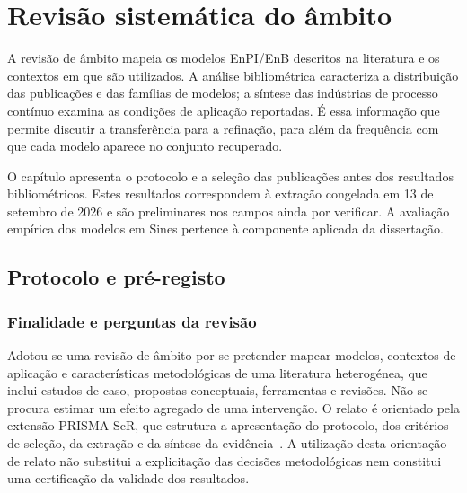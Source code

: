 
\chapter{Revisão sistemática do âmbito}
\label{cha:revisao}

A revisão de âmbito mapeia os modelos EnPI/EnB descritos na literatura
e os contextos em que são utilizados. A análise bibliométrica caracteriza
a distribuição das publicações e das famílias de modelos; a síntese das
indústrias de processo contínuo examina as condições de aplicação
reportadas. É essa informação que permite discutir a transferência para
a refinação, para além da frequência com que cada modelo aparece no
conjunto recuperado.

O capítulo apresenta o protocolo e a seleção das publicações antes dos
resultados bibliométricos. Estes resultados correspondem à extração
congelada em 13 de setembro de 2026 e são preliminares nos campos ainda
por verificar. A avaliação empírica dos modelos em Sines pertence à
componente aplicada da dissertação.

\section{Protocolo e pré-registo}
\label{sec:protocolo-sr}

\subsection{Finalidade e perguntas da revisão}

Adotou-se uma revisão de âmbito por se pretender mapear modelos,
contextos de aplicação e características metodológicas de uma literatura
heterogénea, que inclui estudos de caso, propostas conceptuais, ferramentas
e revisões. Não se procura estimar um efeito agregado de uma intervenção.
O relato é orientado pela extensão PRISMA-ScR, que estrutura a apresentação
do protocolo, dos critérios de seleção, da extração e da síntese da
evidência~\cite{Tricco2018}. A utilização desta orientação de relato não
substitui a explicitação das decisões metodológicas nem constitui uma
certificação da validade dos resultados.

